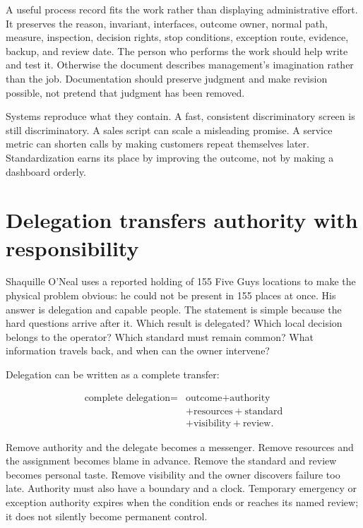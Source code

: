 A useful process record fits the work rather than displaying administrative
effort. It preserves the reason, invariant, interfaces, outcome owner, normal
path, measure, inspection, decision rights, stop conditions, exception route,
evidence, backup, and review date. The person who performs the work should help
write and test it. Otherwise the document describes management's imagination
rather than the job. Documentation should preserve judgment and make revision
possible, not pretend that judgment has been removed.

Systems reproduce what they contain. A fast, consistent discriminatory screen
is still discriminatory. A sales script can scale a misleading promise. A
service metric can shorten calls by making customers repeat themselves later.
Standardization earns its place by improving the outcome, not by making a
dashboard orderly.

\section{Delegation transfers authority with responsibility}

Shaquille O'Neal uses a reported holding of 155 Five Guys locations to make the
physical problem obvious: he could not be present in 155 places at once. His
answer is delegation and capable people. The statement is simple because the
hard questions arrive after it. Which result is delegated? Which local decision
belongs to the operator? Which standard must remain common? What information
travels back, and when can the owner intervene?

Delegation can be written as a complete transfer:

\begin{equation}
\begin{aligned}
\text{complete delegation}={}&\text{outcome}+\text{authority}\\
&+\text{resources}+\text{standard}\\
&+\text{visibility}+\text{review}.
\end{aligned}
\end{equation}

Remove authority and the delegate becomes a messenger. Remove resources and
the assignment becomes blame in advance. Remove the standard and review becomes
personal taste. Remove visibility and the owner discovers failure too late.
Authority must also have a boundary and a clock. Temporary emergency or
exception authority expires when the condition ends or reaches its named review;
it does not silently become permanent control.

